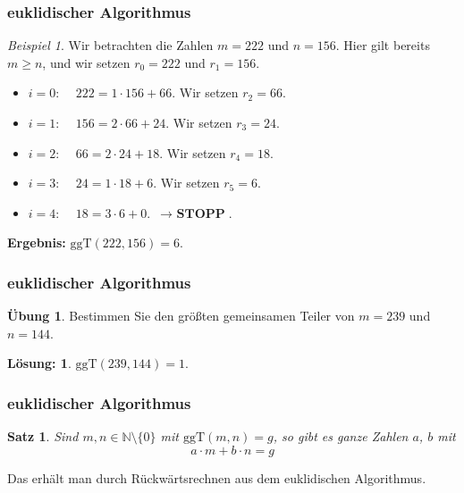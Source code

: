 \documentclass[hyperref={pdfpagelabels=false}]{beamer}
\theoremstyle{plain}%
\newtheorem*{satz}{Satz}
\theoremstyle{definition}
\newtheorem*{uebung}{Übung}
\newtheorem*{sol}{Lösung:}
\theoremstyle{remark}
\newtheorem*{beispiel}{Beispiel}
\begin{document}
\begin{frame}
\frametitle{euklidischer Algorithmus}

\begin{beispiel}

Wir betrachten die Zahlen $m = 222$ und $n = 156$. Hier gilt bereits $m \geq n$, und wir setzen
$r_0 = 222$ und $r_1 = 156$.

\begin{itemize}
\item<2-> $i = 0$: $\quad 222 = 1 \cdot 156 + 66$. Wir setzen $r_2 = 66$.
\item<3-> $i = 1$: $\quad 156 = 2 \cdot 66 + 24$. Wir setzen $r_3 = 24$.
\item<4-> $i = 2$: $\quad 66 = 2 \cdot 24 + 18$. Wir setzen $r_4 = 18$.
\item<5-> $i = 3$: $\quad 24 = 1 \cdot 18 + 6$. Wir setzen $r_5 = 6$.
\item<6-> $i = 4$: $\quad 18 = 3 \cdot 6 + 0$. $\, \longrightarrow \textbf{ STOPP}$.
\end{itemize}

\bigbreak

\pause \pause \pause \pause \pause \pause 
\textbf{Ergebnis:} $\mathrm{ggT}(222, 156) = 6$.

\end{beispiel}
\end{frame}

\begin{frame}
\frametitle{euklidischer Algorithmus}

\begin{uebung}
Bestimmen Sie den größten gemeinsamen Teiler von $m = 239$ und $n=144$. 
\end{uebung}

\bigbreak
\pause \pause 

\begin{sol}
$\mathrm{ggT}(239, 144) = 1$.
\end{sol}

\end{frame}

\begin{frame}
\frametitle{euklidischer Algorithmus}

\begin{satz} Sind $m,n\in \mathbb N \setminus \{0 \}$ mit 
$\mathrm{ggT}(m,n) = g$, so gibt es ganze Zahlen $a$, $b$ mit 
  	$$ a \cdot m + b \cdot n = g $$
\end{satz}

\bigbreak

\pause
Das erhält man durch Rückwärtsrechnen aus dem euklidischen Algorithmus.


\end{frame}
\end{document}
